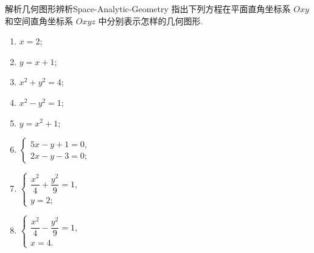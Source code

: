 \begin{problem}{解析几何图形辨析}{Space-Analytic-Geometry}
    指出下列方程在平面直角坐标系 $Oxy$ 和空间直角坐标系 $Oxyz$ 中分别表示怎样的几何图形.
    \begin{enumerate}
        \item $x = 2$;
        \item $y = x + 1$;
        \item $x^2 + y^2 = 4$;
        \item $x^2 - y^2 = 1$;
        \item $y = x^2 + 1$;
        \item $\begin{cases} 5x - y + 1 = 0, \\ 2x - y - 3 = 0; \end{cases}$
        \item $\begin{cases} \dfrac{x^2}{4} + \dfrac{y^2}{9} = 1, \\ y = 2; \end{cases}$
        \item $\begin{cases} \dfrac{x^2}{4} - \dfrac{y^2}{9} = 1, \\ x = 4. \end{cases}$
    \end{enumerate}
\end{problem}


